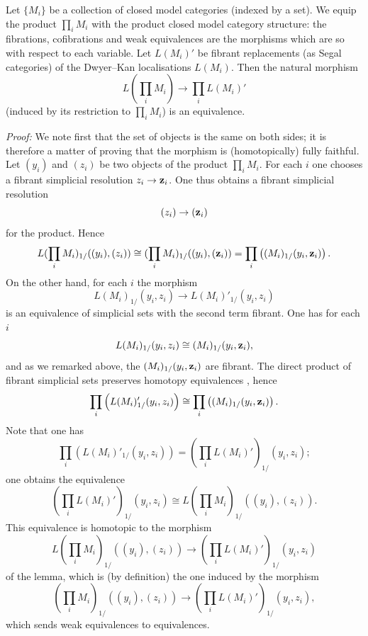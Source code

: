\begin{lemma}
\label{equivalence1}
Let $\{ M_i\}$ be a collection of closed model categories
(indexed by a set). We equip the product $\prod _i M_i$
with the product closed model category structure: the fibrations,
cofibrations and weak equivalences are the morphisms which are so with
respect to
each variable. Let $L(M_i)'$ be fibrant replacements (as
Segal categories) of the Dwyer--Kan localisations $L(M_i)$.
Then the natural morphism
$$
L(\prod _i M_i)\rightarrow \prod _i L(M_i)'
$$
(induced by its restriction to $\prod _i M_i$) is an equivalence.
\end{lemma}
{\em Proof:}
We note first that the set of objects is the same on both sides;
it is therefore a matter of proving that the morphism is (homotopically)
fully
faithful. Let $(y_i)$ and $(z_i)$ be two objects of the product $\prod _i M_i$.
For each $i$ one chooses a fibrant simplicial resolution $z_i
\rightarrow
{\bf z}_i$. One thus obtains a fibrant simplicial resolution
$$
(z_i)\rightarrow ({\bf z}_i)
$$
for the product. Hence
$$
L(\prod _i M_i) _{1/}((y_i), (z_i))\cong
(\prod _i M_i)_{1/}((y_i), ({\bf z}_i)) = \prod _i \left(
(M_i)_{1/}(y_i,{\bf z}_i)\right) .
$$
On the other hand, for each $i$ the morphism
$$
L(M_i)_{1/}(y_i, z_i)\rightarrow L(M_i)'_{1/}(y_i,z_i)
$$
is an equivalence of simplicial sets with the second term fibrant.
One has for each $i$
$$
L(M_i)_{1/}(y_i, z_i)\cong (M_i)_{1/}(y_i,{\bf z}_i),
$$
and as we remarked above, the
$(M_i)_{1/}(y_i,{\bf z}_i)$ are fibrant. The direct product of fibrant
simplicial sets preserves homotopy equivalences
\cite{JardineBool}, hence
$$
\prod _i \left(L(M_i)'_{1/}(y_i, z_i)\right) \cong \prod _i \left(
(M_i)_{1/}(y_i,{\bf z}_i)\right) .
$$
Note that one has
$$
\prod _i \left(L(M_i)'_{1/}(y_i, z_i)\right) =
(\prod _i L(M_i)')_{1/}(y_i, z_i);
$$
one obtains the equivalence
$$
(\prod _i L(M_i)')_{1/}(y_i, z_i)\cong
L(\prod _i M_i) _{1/}((y_i), (z_i)).
$$
This equivalence is homotopic to the morphism
$$
L(\prod _i M_i) _{1/}((y_i), (z_i))\rightarrow
(\prod _i L(M_i)')_{1/}(y_i, z_i)
$$
of the lemma, which is (by definition) the one induced by the morphism
$$
(\prod _i M_i) _{1/}((y_i), (z_i))\rightarrow
(\prod _i L(M_i)')_{1/}(y_i, z_i),
$$
which sends weak equivalences to equivalences.
\eop

